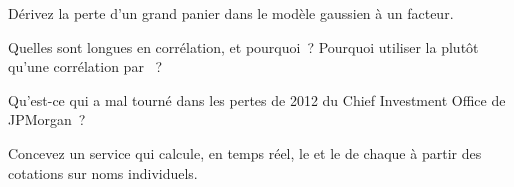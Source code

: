 \begin{interviewq}\label{iq:m2:credit-indices-and-tranches:3}
Dérivez la perte d'un grand panier dans le modèle gaussien à un facteur.
\end{interviewq}

\begin{interviewq}\label{iq:m2:credit-indices-and-tranches:4}
Quelles  sont longues en corrélation, et pourquoi~? Pourquoi utiliser la 
plutôt qu'une corrélation par ~?
\end{interviewq}

\begin{interviewq}\label{iq:m2:credit-indices-and-tranches:5}
Qu'est-ce qui a mal tourné dans les pertes de 2012 du Chief Investment Office de JPMorgan~?
\end{interviewq}

\begin{interviewq}\label{iq:m2:credit-indices-and-tranches:6}
Concevez un service qui calcule, en temps réel, le  et le  de chaque
 à partir des cotations sur noms individuels.
\end{interviewq}
